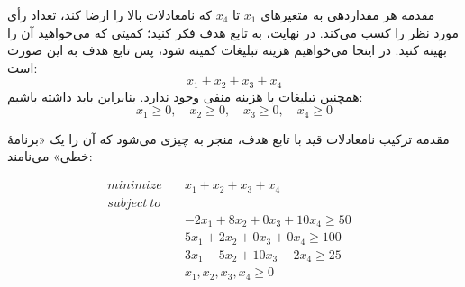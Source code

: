 \begin{itemframe}{مقدمه}
\itm
هر مقداردهی به متغیرهای
$x_1$
تا
$x_4$
که نامعادلات بالا را ارضا کند، تعداد رأی مورد نظر را کسب می‌کند.
\itm
در نهایت، به تابع هدف فکر کنید؛ کمیتی که می‌خواهید آن را بهینه کنید. در اینجا می‌خواهیم هزینه تبلیغات کمینه شود، پس تابع هدف به این صورت است:
$$
x_1 + x_2 + x_3 + x_4
$$
\itm
همچنین تبلیغات با هزینه منفی وجود ندارد. بنابراین باید داشته باشیم:
$$
x_1 \ge 0,\quad x_2 \ge 0,\quad x_3 \ge 0,\quad x_4 \ge 0
$$
\end{itemframe}


\begin{itemframe}{مقدمه}
\itm
ترکیب نامعادلات قید با تابع هدف، منجر به چیزی می‌شود که آن را یک
«برنامهٔ خطی»
 می‌نامند:

\begin{align*}
minimize \quad & x_1 + x_2 + x_3 + x_4 \\
subject \: to \quad \\
& -2x_1 + 8x_2 + 0x_3 + 10x_4 \ge 50 \\
& 5x_1 + 2x_2 + 0x_3 + 0x_4 \ge 100 \\
& 3x_1 - 5x_2 + 10x_3 - 2x_4 \ge 25 \\
&x_1, x_2, x_3, x_4 \ge 0&
\end{align*}
\end{itemframe}


